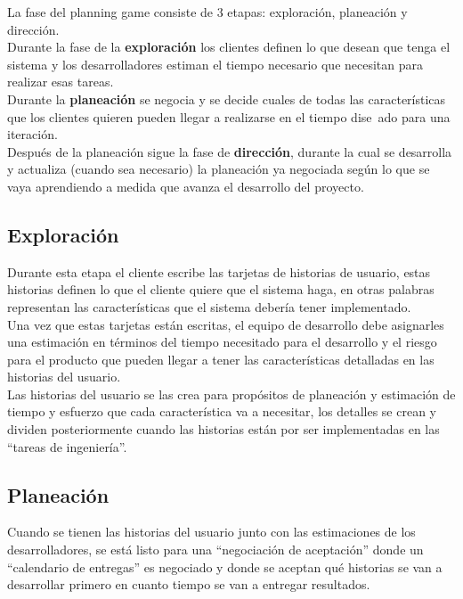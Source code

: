   La fase del planning game consiste de 3 etapas: exploración, planeaci\'on y direcci\'on.\\

  Durante la fase de la \textbf{exploración} los clientes definen lo que desean que tenga el sistema y los desarrolladores estiman el tiempo necesario que necesitan para realizar esas tareas.\\

  Durante la \textbf{planeación} se negocia y se decide cuales de todas las características que los clientes quieren pueden llegar a realizarse en el tiempo dise~ado para una iteración.\\

  Después de la planeación sigue la fase de \textbf{dirección}, durante la cual se desarrolla y actualiza (cuando sea necesario) la planeación ya negociada según lo que se vaya aprendiendo a medida que avanza el desarrollo del proyecto.\\

    \subsection{Exploración}
    \label{sub:exploracion}
      Durante esta etapa el cliente escribe las tarjetas de historias de usuario, estas historias definen lo que el cliente quiere que el sistema haga, en otras palabras representan las características que el sistema debería tener implementado.\\

      Una vez que estas tarjetas están escritas, el equipo de desarrollo debe asignarles una estimación en términos del tiempo necesitado para el desarrollo y el riesgo para el producto que pueden llegar a tener las características detalladas en las historias del usuario.\\

      Las historias del usuario se las crea para propósitos de planeación y estimación de tiempo y esfuerzo que cada característica va a necesitar, los detalles se crean y dividen posteriormente cuando las historias están por ser implementadas en las “tareas de ingeniería”.\\

    \subsection{Planeación}
    \label{sub:planeacion}

      Cuando se tienen las historias del usuario junto con las estimaciones de los desarrolladores, se está listo para una “negociación de aceptación” donde un “calendario de entregas”  es negociado y donde se aceptan qué historias se van a desarrollar primero en cuanto tiempo se van a entregar resultados.\\

